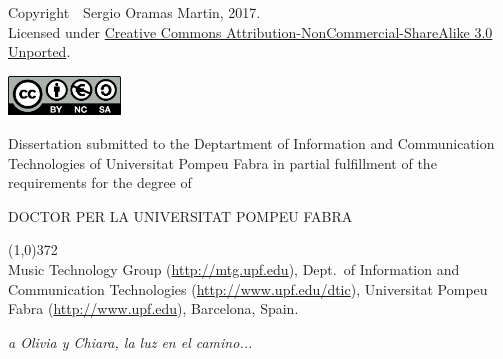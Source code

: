 \cleartorecto
\thispagestyle{empty}

{\footnotesize Copyright~\textcopyright~Sergio Oramas Martin, 2017.}
\\{\footnotesize Licensed under \href{http://creativecommons.org/licenses/by-nc-sa/3.0/}{Creative Commons Attribution-NonCommercial-ShareAlike 3.0 Unported}.}

\href{http://creativecommons.org/licenses/by-nc-sa/3.0/}{\includegraphics[width=3cm]{ch00_pics/creative-commons2.png}}


\vspace*{5cm}


Dissertation submitted to the Deptartment of Information and Communication Technologies of Universitat Pompeu Fabra in partial fulfillment of the requirements for the degree of

\vspace*{0.5cm}

\centerline{DOCTOR PER LA UNIVERSITAT POMPEU FABRA}

\vspace*{0.6cm}



\vspace*{\fill}

\line(1,0){372}\\
\footnotesize
Music Technology Group (\url{http://mtg.upf.edu}), Dept.~of Information and Communication Technologies (\url{http://www.upf.edu/dtic}), Universitat Pompeu Fabra (\url{http://www.upf.edu}), Barcelona, Spain.
\normalsize


\cleartorecto



\cleartorecto



\cleartorecto
\thispagestyle{empty}
\vspace*{3cm}
\begin{flushright}
\textit{a Olivia y Chiara, la luz en el camino...}
\end{flushright}

